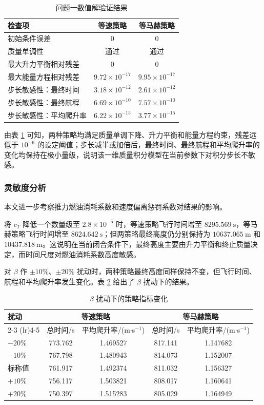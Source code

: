 \documentclass[withoutpreface,bwprint]{cumcmthesis}
\begin{document}
\begin{table}[h]
\centering\caption{问题一数值解验证结果}\label{tab:validation}
\begin{tabular}{lcc}\toprule
检查项 & 等速策略 & 等马赫策略 \\
\midrule
初始条件误差 & $0$ & $0$ \\
质量单调性 & 通过 & 通过 \\
最大升力平衡相对残差 & $0$ & $0$ \\
最大能量方程相对残差 & $9.72\times 10^{-17}$ & $9.95\times 10^{-17}$ \\
步长敏感性：最终时间 & $3.18\times 10^{-12}$ & $2.61\times 10^{-12}$ \\
步长敏感性：最终航程 & $6.69\times 10^{-10}$ & $7.57\times 10^{-10}$ \\
步长敏感性：平均爬升率 & $6.22\times 10^{-15}$ & $3.77\times 10^{-15}$ \\
\bottomrule
\end{tabular}
\end{table}

由表 \ref{tab:validation} 可知，两种策略均满足质量单调下降、升力平衡和能量方程约束，残差远低于 $10^{-6}$ 的设定阈值；步长减半或加倍后，最终时间、最终航程和平均爬升率的变化均保持在极小量级，说明该一维质量积分模型在当前参数下对积分步长不敏感。

\subsubsection{灵敏度分析}

本文进一步考察推力燃油消耗系数和速度偏离惩罚系数对结果的影响。

将 $c_T$ 降低一个数量级至 $2.8\times 10^{-5}$ 时，等速策略飞行时间增至 $8295.569\ \mathrm{s}$，等马赫策略飞行时间增至 $8624.642\ \mathrm{s}$；但两策略最终高度仍分别保持为 $10637.065\ \mathrm{m}$ 和 $10437.818\ \mathrm{m}$。这说明在当前闭合条件下，最终高度主要由升力平衡和终止质量决定，而时间尺度对燃油消耗系数高度敏感。

对 $\beta$ 作 $\pm 10\%$、$\pm 20\%$ 扰动时，两种策略最终高度同样保持不变，但飞行时间、航程和平均爬升率发生变化。表 \ref{tab:sensitivity} 给出了 $\beta$ 扰动下的结果。

\begin{table}[h]
\centering\caption{$\beta$ 扰动下的策略指标变化}\label{tab:sensitivity}
\begin{tabular}{lcccc}\toprule
扰动 & \multicolumn{2}{c}{等速策略} & \multicolumn{2}{c}{等马赫策略} \\
\cmidrule(lr){2-3} \cmidrule(lr){4-5}
 & 总时间/s & 平均爬升率/(m$\cdot$s$^{-1}$) & 总时间/s & 平均爬升率/(m$\cdot$s$^{-1}$) \\
\midrule
$-20\%$ & 773.762 & 1.469527 & 817.141 & 1.147682 \\
$-10\%$ & 767.798 & 1.480943 & 814.073 & 1.152007 \\
标称值 & 761.917 & 1.492374 & 811.032 & 1.156327 \\
$+10\%$ & 756.117 & 1.503821 & 808.017 & 1.160641 \\
$+20\%$ & 750.397 & 1.515283 & 805.029 & 1.164949 \\
\bottomrule
\end{tabular}
\end{table}
\end{document}
